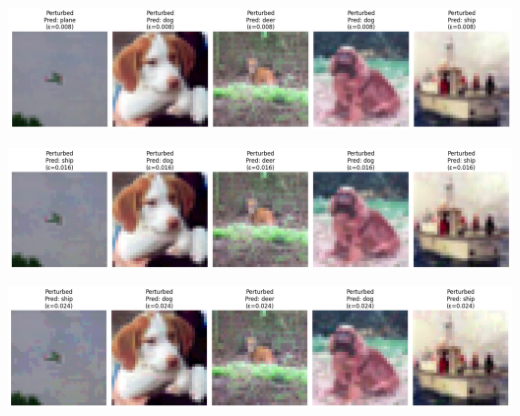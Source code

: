 \begin{qsolve}
	\begin{center}
		\includegraphics*[width=0.8\linewidth]{pics/img17.png}
		\label{خروجی شبکه متخاصمم به ازای epsilon=2/255}
	\end{center}
	
	\begin{center}
		\includegraphics*[width=0.8\linewidth]{pics/img18.png}
		\label{خروجی شبکه متخاصمم به ازای epsilon=4/255}
	\end{center}
	
	\begin{center}
		\includegraphics*[width=0.8\linewidth]{pics/img19.png}
		\label{خروجی شبکه متخاصمم به ازای epsilon=6/255}
	\end{center}
\end{qsolve}
